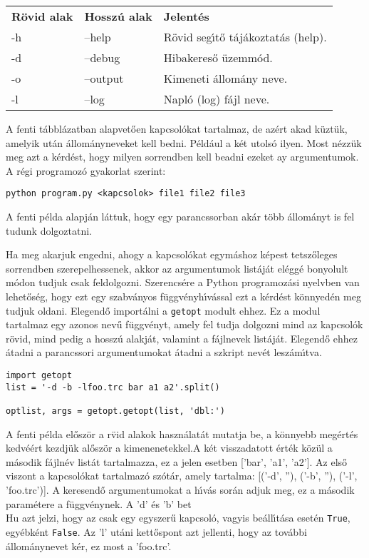 \begin{tabular}{lll}
   {\bf R\"ovid alak} & {\bf Hossz\'u alak} & {\bf Jelent\'es}\\
   -h & --help & R\"ovid seg\'{\i}t\H{o} t\'aj\'akoztat\'as (help).\\
   -d & --debug & Hibakeres\H{o} \"uzemm\'od.\\
   -o & --output & Kimeneti \'allom\'any neve.\\
   -l & --log & Napl\'o (log) f\'ajl neve.\\
\end {tabular}

\noindent A fenti t\'abbl\'azatban alapvet\H{o}en kapcsol\'okat tartalmaz, de az\'ert akad k\"uzt\"uk, amelyik 
ut\'an \'allom\'anyneveket kell bedni. P\'eld\'aul a k\'et utols\'o ilyen. Most n\'ezz\"uk meg azt a k\'erd\'est, 
hogy milyen sorrendben kell beadni ezeket ay argumentumok. A r\'egi programoz\'o gyakorlat szerint:

\begin{Verbatim}[fontsize=\small]
python program.py <kapcsolok> file1 file2 file3
\end{Verbatim}

\noindent A fenti p\'elda alapj\'an l\'attuk, hogy egy parancssorban ak\'ar t\"obb \'allom\'anyt is fel tudunk 
dolgoztatni.

Ha meg akarjuk engedni, ahogy a kapcsol\'okat egym\'ashoz k\'epest tetsz\H{o}leges sorrendben szerepelhessenek, 
akkor az argumentumok list\'aj\'at el\'egg\'e bonyolult m\'odon tudjuk csak feldolgozni. Szerencs\'ere a Python 
programoz\'asi nyelvben van lehet\H{o}s\'eg, hogy ezt egy szabv\'anyos f\"uggv\'enyh\'{\i}v\'assal ezt a k\'erd\'est 
 k\"onnyed\'en meg tudjuk oldani. Elegend\H{o} import\'alni a {\tt getopt} modult ehhez. Ez a 
modul tartalmaz egy azonos nev\H{u} f\"uggv\'enyt, amely fel tudja dolgozni mind az kapcsol\'ok r\"ovid, mind 
pedig a hossz\'u alakj\'at, valamint a f\'ajlnevek list\'aj\'at. Elegend\H{o} ehhez \'atadni a parancssori 
argumentumokat \'atadni a szkript nev\'et lesz\'am\'{\i}tva. 

\begin{Verbatim}[fontsize=\small]
import getopt
list = '-d -b -lfoo.trc bar a1 a2'.split()

optlist, args = getopt.getopt(list, 'dbl:')
\end{Verbatim}

\noindent A fenti p\'elda el\H{o}sz\"or a r\"vid alakok haszn\'alat\'at mutatja be, a k\"onnyebb 
meg\'ert\'es kedv\'e\'ert kezdj\"uk al\H{o}sz\"or a kimenenetekkel.A k\'et visszadatott \'ert\'ek 
k\"oz\"ul a m\'asodik f\'ajln\'ev list\'at tartalmazza, ez a jelen esetben ['bar', 'a1', 'a2']. 
Az els\H{o} viszont a kapcsol\'okat tartalmaz\'o sz\'ot\'ar, amely tartalma: [('-d', ''), ('-b', ''), 
('-l', 'foo.trc')]. A keresend\H{o} argumentumokat a h\'{\i}v\'as sor\'an adjuk meg, ez a m\'asodik 
param\'etere a f\"uggv\'enynek. A 'd' \'es 'b' bet\\H{u} azt jelzi, hogy az csak egy egyszer\H{u} 
kapcsol\'o, vagyis be\'all\'{\i}t\'asa eset\'en {\tt True}, egy\'ebk\'ent {\tt False}. Az 'l' ut\'ani 
kett\H{o}spont azt jellenti, hogy az tov\'abbi \'allom\'anynevet k\'er, ez most a 'foo.trc'.  

